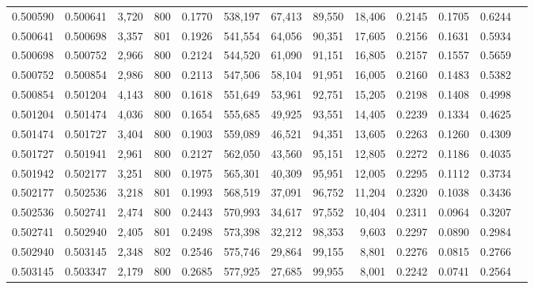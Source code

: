 \begin{tabular}{rrrrrrrrrrrrr}
0.500590 & 0.500641 & 3,720 & 800 &                                     0.1770 & 538,197 &  67,413 &  89,550 &  18,406 & 0.2145 & 0.1705 & 0.6244 \\
0.500641 & 0.500698 & 3,357 & 801 &                                     0.1926 & 541,554 &  64,056 &  90,351 &  17,605 & 0.2156 & 0.1631 & 0.5934 \\
0.500698 & 0.500752 & 2,966 & 800 &                                     0.2124 & 544,520 &  61,090 &  91,151 &  16,805 & 0.2157 & 0.1557 & 0.5659 \\
0.500752 & 0.500854 & 2,986 & 800 &                                     0.2113 & 547,506 &  58,104 &  91,951 &  16,005 & 0.2160 & 0.1483 & 0.5382 \\
0.500854 & 0.501204 & 4,143 & 800 &                                     0.1618 & 551,649 &  53,961 &  92,751 &  15,205 & 0.2198 & 0.1408 & 0.4998 \\
0.501204 & 0.501474 & 4,036 & 800 &                                     0.1654 & 555,685 &  49,925 &  93,551 &  14,405 & 0.2239 & 0.1334 & 0.4625 \\
0.501474 & 0.501727 & 3,404 & 800 &                                     0.1903 & 559,089 &  46,521 &  94,351 &  13,605 & 0.2263 & 0.1260 & 0.4309 \\
0.501727 & 0.501941 & 2,961 & 800 &                                     0.2127 & 562,050 &  43,560 &  95,151 &  12,805 & 0.2272 & 0.1186 & 0.4035 \\
0.501942 & 0.502177 & 3,251 & 800 &                                     0.1975 & 565,301 &  40,309 &  95,951 &  12,005 & 0.2295 & 0.1112 & 0.3734 \\
0.502177 & 0.502536 & 3,218 & 801 &                                     0.1993 & 568,519 &  37,091 &  96,752 &  11,204 & 0.2320 & 0.1038 & 0.3436 \\
0.502536 & 0.502741 & 2,474 & 800 &                                     0.2443 & 570,993 &  34,617 &  97,552 &  10,404 & 0.2311 & 0.0964 & 0.3207 \\
0.502741 & 0.502940 & 2,405 & 801 &                                     0.2498 & 573,398 &  32,212 &  98,353 &   9,603 & 0.2297 & 0.0890 & 0.2984 \\
0.502940 & 0.503145 & 2,348 & 802 &                                     0.2546 & 575,746 &  29,864 &  99,155 &   8,801 & 0.2276 & 0.0815 & 0.2766 \\
0.503145 & 0.503347 & 2,179 & 800 &                                     0.2685 & 577,925 &  27,685 &  99,955 &   8,001 & 0.2242 & 0.0741 & 0.2564 \\

\end{tabular}
